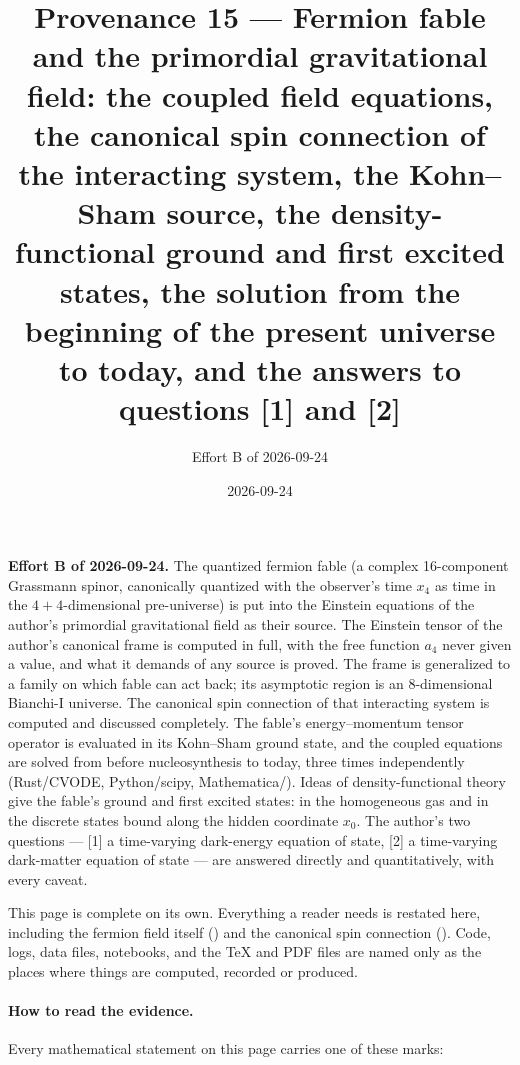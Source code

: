\title{Provenance 15 --- Fermion fable and the primordial gravitational field: the coupled field
equations, the canonical spin connection of the interacting system, the Kohn--Sham source, the
density-functional ground and first excited states, the solution from the beginning of the present
universe to today, and the answers to questions [1] and [2]}
\author{Effort B of 2026-09-24}
\date{2026-09-24}


\maketitle

\noindent\textbf{Effort B of 2026-09-24.} The quantized fermion fable (a complex 16-component
Grassmann spinor, canonically quantized with the observer's time $x_4$ as time in the
$4+4$-dimensional pre-universe) is put into the Einstein equations of the author's primordial
gravitational field as their source. The Einstein tensor of the author's canonical frame is computed in
full, with the free function $a_4$ never given a value, and what it demands of any source is proved.
The frame is generalized to a family on which fable can act back; its asymptotic region is an
8-dimensional Bianchi-I universe. The canonical spin connection of that interacting system is computed
and discussed completely. The fable's energy--momentum tensor operator is evaluated in its Kohn--Sham
ground state, and the coupled equations are solved from before nucleosynthesis to today, three times
independently (Rust/CVODE, Python/scipy, Mathematica/). Ideas of density-functional
theory give the fable's ground and first excited states: in the homogeneous gas and in the discrete
states bound along the hidden coordinate $x_0$. The author's two questions --- [1] a time-varying
dark-energy equation of state, [2] a time-varying dark-matter equation of state --- are answered
directly and quantitatively, with every caveat.

This page is complete on its own. Everything a reader needs is restated here, including the fermion
field itself () and the canonical spin connection (). Code, logs, data
files, notebooks, and the TeX and PDF files are named only as the places where things are computed,
recorded or produced.

\paragraph{How to read the evidence.} Every mathematical statement on this page carries one of these
marks:

